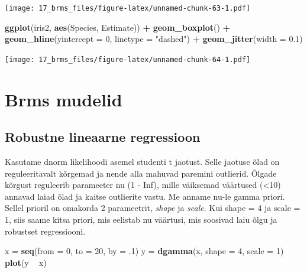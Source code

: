 \documentclass[]{book}
\newenvironment{Shaded}{\begin{snugshade}}{\end{snugshade}}
\newcommand{\KeywordTok}[1]{\textcolor[rgb]{0.13,0.29,0.53}{\textbf{#1}}}
\newcommand{\DataTypeTok}[1]{\textcolor[rgb]{0.13,0.29,0.53}{#1}}
\newcommand{\DecValTok}[1]{\textcolor[rgb]{0.00,0.00,0.81}{#1}}
\newcommand{\FloatTok}[1]{\textcolor[rgb]{0.00,0.00,0.81}{#1}}
\newcommand{\StringTok}[1]{\textcolor[rgb]{0.31,0.60,0.02}{#1}}
\newcommand{\OperatorTok}[1]{\textcolor[rgb]{0.81,0.36,0.00}{\textbf{#1}}}
\newcommand{\NormalTok}[1]{#1}
\begin{document}
\texttt{[image: 17\_brms\_files/figure-latex/unnamed-chunk-63-1.pdf]}

\begin{Shaded}
\begin{Highlighting}[]
\KeywordTok{ggplot}\NormalTok{(iris2, }\KeywordTok{aes}\NormalTok{(Species, Estimate)) }\OperatorTok{+}\StringTok{ }
\StringTok{  }\KeywordTok{geom_boxplot}\NormalTok{() }\OperatorTok{+}
\StringTok{  }\KeywordTok{geom_hline}\NormalTok{(}\DataTypeTok{yintercept =} \DecValTok{0}\NormalTok{, }\DataTypeTok{linetype =} \StringTok{"dashed"}\NormalTok{) }\OperatorTok{+}
\StringTok{  }\KeywordTok{geom_jitter}\NormalTok{(}\DataTypeTok{width =} \FloatTok{0.1}\NormalTok{)}
\end{Highlighting}
\end{Shaded}

\texttt{[image: 17\_brms\_files/figure-latex/unnamed-chunk-64-1.pdf]}

\chapter{Brms mudelid}\label{brms-mudelid}

\section{Robustne lineaarne
regressioon}\label{robustne-lineaarne-regressioon}

Kasutame dnorm likelihoodi asemel studenti t jaotust. Selle jaotuse õlad
on reguleeritavalt kõrgemad ja nende alla mahuvad paremini outlierid.
Õlgade kõrgust reguleerib parameeter nu (1 - Inf), mille väiksemad
väärtused (\textless{}10) annavad laiad õlad ja kaitse outlierite vastu.
Me anname nu-le gamma priori. Sellel prioril on omakorda 2 parameetrit,
\emph{shape} ja \emph{scale}. Kui shape = 4 ja scale = 1, siis saame
kitsa priori, mis eelistab nu väärtusi, mis soosivad laiu õlgu ja
robustset regressiooni.

\begin{Shaded}
\begin{Highlighting}[]
\NormalTok{x =}\StringTok{ }\KeywordTok{seq}\NormalTok{(}\DataTypeTok{from =} \DecValTok{0}\NormalTok{, }\DataTypeTok{to =} \DecValTok{20}\NormalTok{, }\DataTypeTok{by =}\NormalTok{ .}\DecValTok{1}\NormalTok{)}
\NormalTok{y =}\StringTok{ }\KeywordTok{dgamma}\NormalTok{(x, }\DataTypeTok{shape =} \DecValTok{4}\NormalTok{, }\DataTypeTok{scale =} \DecValTok{1}\NormalTok{)}
\KeywordTok{plot}\NormalTok{(y }\OperatorTok{~}\StringTok{ }\NormalTok{x)}
\end{Highlighting}
\end{Shaded}
\end{document}
